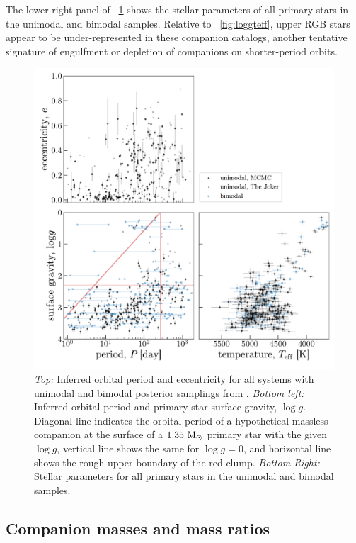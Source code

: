 \documentclass[modern, letterpaper]{aastex62}
\newcommand{\thejoker}{\project{The~Joker}}
\newcommand{\logg}{\ensuremath{\log g}}
\begin{document}
The lower right panel of \figurename~\ref{fig:logg-teff-p-e} shows the stellar
parameters of all primary stars in the unimodal and bimodal samples.
Relative to \figurename~\ref{fig:loggteff}, upper RGB stars appear to be
under-represented in these companion catalogs, another tentative signature of
engulfment or depletion of companions on shorter-period orbits.

\begin{figure}[h]
\begin{center}
\includegraphics[width=\textwidth]{P-Teff-logg-e}
\end{center}
\caption{%
\textit{Top:} Inferred orbital period and eccentricity for all systems with
unimodal and bimodal posterior samplings from \thejoker.
\textit{Bottom left:} Inferred orbital period and primary star surface gravity,
\logg.
Diagonal line indicates the orbital period of a hypothetical massless companion
at the surface of a $1.35~\mathrm{M}_\odot$ primary star with the given \logg, vertical
line shows the same for $\logg = 0$, and horizontal line shows the rough upper
boundary of the red clump.
\textit{Bottom Right:} Stellar parameters for all primary stars in the unimodal
and bimodal samples.
\label{fig:logg-teff-p-e}
}
\end{figure}

\subsection{Companion masses and mass ratios}
\end{document}
